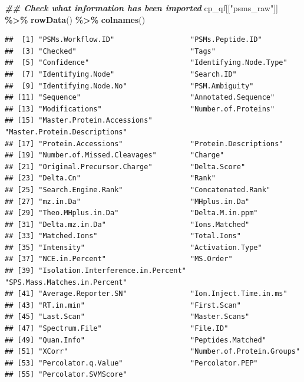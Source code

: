 \documentclass[9pt,a4paper,]{extarticle}
\newenvironment{Shaded}{\begin{snugshade}}{\end{snugshade}}
\newcommand{\DocumentationTok}[1]{\textcolor[rgb]{0.56,0.35,0.01}{\textbf{\textit{#1}}}}
\newcommand{\FunctionTok}[1]{\textcolor[rgb]{0.13,0.29,0.53}{\textbf{#1}}}
\newcommand{\NormalTok}[1]{#1}
\newcommand{\SpecialCharTok}[1]{\textcolor[rgb]{0.81,0.36,0.00}{\textbf{#1}}}
\newcommand{\StringTok}[1]{\textcolor[rgb]{0.31,0.60,0.02}{#1}}
\begin{document}
\begin{Shaded}
\begin{Highlighting}[]
\DocumentationTok{\#\# Check what information has been imported}
\NormalTok{cp\_qf[[}\StringTok{"psms\_raw"}\NormalTok{]] }\SpecialCharTok{\%\textgreater{}\%}
  \FunctionTok{rowData}\NormalTok{() }\SpecialCharTok{\%\textgreater{}\%}
  \FunctionTok{colnames}\NormalTok{()}
\end{Highlighting}
\end{Shaded}

\begin{verbatim}
##  [1] "PSMs.Workflow.ID"                  "PSMs.Peptide.ID"                  
##  [3] "Checked"                           "Tags"                             
##  [5] "Confidence"                        "Identifying.Node.Type"            
##  [7] "Identifying.Node"                  "Search.ID"                        
##  [9] "Identifying.Node.No"               "PSM.Ambiguity"                    
## [11] "Sequence"                          "Annotated.Sequence"               
## [13] "Modifications"                     "Number.of.Proteins"               
## [15] "Master.Protein.Accessions"         "Master.Protein.Descriptions"      
## [17] "Protein.Accessions"                "Protein.Descriptions"             
## [19] "Number.of.Missed.Cleavages"        "Charge"                           
## [21] "Original.Precursor.Charge"         "Delta.Score"                      
## [23] "Delta.Cn"                          "Rank"                             
## [25] "Search.Engine.Rank"                "Concatenated.Rank"                
## [27] "mz.in.Da"                          "MHplus.in.Da"                     
## [29] "Theo.MHplus.in.Da"                 "Delta.M.in.ppm"                   
## [31] "Delta.mz.in.Da"                    "Ions.Matched"                     
## [33] "Matched.Ions"                      "Total.Ions"                       
## [35] "Intensity"                         "Activation.Type"                  
## [37] "NCE.in.Percent"                    "MS.Order"                         
## [39] "Isolation.Interference.in.Percent" "SPS.Mass.Matches.in.Percent"      
## [41] "Average.Reporter.SN"               "Ion.Inject.Time.in.ms"            
## [43] "RT.in.min"                         "First.Scan"                       
## [45] "Last.Scan"                         "Master.Scans"                     
## [47] "Spectrum.File"                     "File.ID"                          
## [49] "Quan.Info"                         "Peptides.Matched"                 
## [51] "XCorr"                             "Number.of.Protein.Groups"         
## [53] "Percolator.q.Value"                "Percolator.PEP"                   
## [55] "Percolator.SVMScore"
\end{verbatim}
\end{document}
